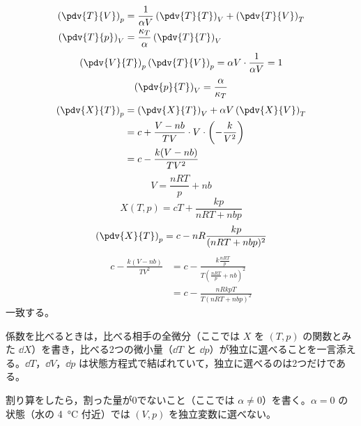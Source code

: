 \begin{align*}
\left(\pdv{T}{V}\right)_{p}&=\frac{1}{\alpha V}\left(\pdv{T}{T}\right)_{V}+\left(\pdv{T}{V}\right)_{T}\\
\left(\pdv{T}{p}\right)_{V}&=\frac{\kappa_{T}}{\alpha}\left(\pdv{T}{T}\right)_{V}
\end{align*}
\[ \left(\pdv{V}{T}\right)_{p}\left(\pdv{T}{V}\right)_{p}=\alpha V\cdot\frac{1}{\alpha V}=1 \]
\[ \left(\pdv{p}{T}\right)_{V}=\frac{\alpha}{\kappa_{T}} \]
\begin{align*}
\left(\pdv{X}{T}\right)_{p}&=\left(\pdv{X}{T}\right)_{V}+\alpha V\left(\pdv{X}{V}\right)_{T}\\
&=c+\frac{V-nb}{TV}\cdot V\cdot\left(-\frac{k}{V^{2}}\right)\\
&=c-\frac{k(V-nb)}{TV^{2}}
\end{align*}
\[ V=\frac{nRT}{p}+nb \]
\[ X(T,p)=cT+\frac{kp}{nRT+nbp} \]
\[ \left(\pdv{X}{T}\right)_{p}=c-nR\frac{kp}{(nRT+nbp)^{2}} \]
\begin{align*}
c-\frac{k(V-nb)}{TV^{2}}&=c-\frac{k\frac{nRT}{p}}{T\left(\frac{nRT}{p}+nb\right)^{2}}\\
&=c-\frac{nRkpT}{T(nRT+nbp)^{2}}
\end{align*}
一致する。
\item 係数を比べるときは，比べる相手の全微分（ここでは $X$ を $(T,p)$ の関数とみた $\dd X$）を書き，比べる2つの微小量（$\dd T$ と $\dd p$）が独立に選べることを一言添える。$\dd T$，$\dd V$，$\dd p$ は状態方程式で結ばれていて，独立に選べるのは2つだけである。
\item 割り算をしたら，割った量が0でないこと（ここでは $\alpha\neq0$）を書く。$\alpha=0$ の状態（水の \qty{4}{\degreeCelsius} 付近）では $(V,p)$ を独立変数に選べない。
